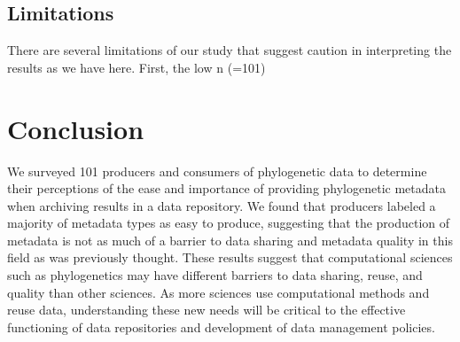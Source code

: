 \documentclass[12pt]{scrartcl}
\begin{document}
\subsection{Limitations}
There are several limitations of our study that suggest caution in interpreting the results as we have here.  First, the low n (=101)

\section{Conclusion}

We surveyed 101 producers and consumers of phylogenetic data to determine their perceptions of the ease and importance of providing phylogenetic metadata when archiving results in a data repository.  We found that producers labeled a majority of metadata types as easy to produce, suggesting that the production of metadata is not as much of a barrier to data sharing and metadata quality in this field as was previously thought.  
These results suggest that computational sciences such as phylogenetics may have different barriers to data sharing, reuse, and quality than other sciences.  As more sciences use computational methods and reuse data, understanding these new needs will be critical to the effective functioning of data repositories and development of data management policies.


\end{document}
